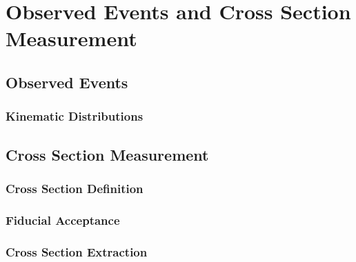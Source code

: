 \graphicspath{{Chapters/CrossSection/Figures/}}
\chapter{Observed Events and Cross Section Measurement}
\label{chap:CrossSection}

\section{Observed Events}
\subsection{Kinematic Distributions}

\section{Cross Section Measurement}
\subsection{Cross Section Definition}
\subsection{Fiducial Acceptance}
\subsection{Cross Section Extraction}
